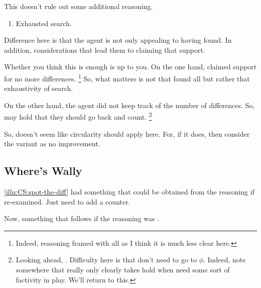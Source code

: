 \begin{note}
  This doesn't rule out some additional reasoning.
  \begin{enumerate}
  \item Exhausted search.
  \end{enumerate}
  Difference here is that the agent is not only appealing to having found.
  In addition, considerations that lead them to claiming that support.

  Whether you think this is enough is up to you.
  On the one hand, claimed support for no more differences.\nolinebreak
  \footnote{
    Indeed, reasoning framed with all as I think it is much less clear here.
  }
  So, what matters is not that found all but rather that exhaustivity of search.

  On the other hand, the agent did not keep track of the number of differences.
  So, may hold that they should go back and count.\nolinebreak
  \footnote{
    Looking ahead, \nI{}.
    Difficulty here is that don't need to go to \(\phi\).
    Indeed, note somewhere that \nI{} really only clearly takes hold when need some sort of factivity in play.
    We'll return to this.
  }
\end{note}

\begin{note}
  So, doesn't seem like circularity should apply here.
  For, if it does, then consider the variant as no improvement.
\end{note}

\subsection{Where's Wally}

\begin{note}
  \autoref{illu:CS:spot-the-diff} had something that could be obtained from the reasoning if re-examined.
  Just need to add a counter.

  Now, something that follows if the reasoning was \nmom{}.
\end{note}

